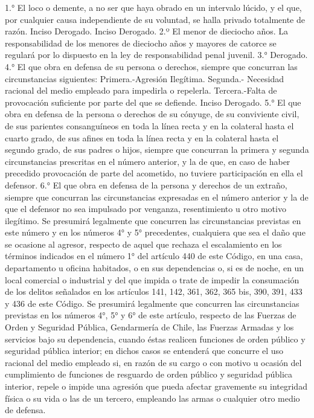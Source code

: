     1.° El loco o demente, a no ser que haya obrado en un intervalo lúcido, y el que, por cualquier causa independiente de su voluntad, se halla privado totalmente de razón.
    Inciso Derogado.
    Inciso Derogado.
    2.º El menor de dieciocho años. La responsabilidad de los menores de dieciocho años y mayores de catorce se regulará por lo dispuesto en la ley de responsabilidad penal juvenil.
    3.° Derogado.
    4.° El que obra en defensa de su persona o derechos, siempre que concurran las circunstancias siguientes:
    Primera.-Agresión Ilegítima.
    Segunda.- Necesidad racional del medio empleado para impedirla o repelerla.
    Tercera.-Falta de provocación suficiente por parte del que se defiende.
    Inciso Derogado.
    5.° El que obra en defensa de la persona o derechos de su cónyuge, de su conviviente civil, de sus parientes consanguíneos en toda la línea recta y en la colateral hasta el cuarto grado, de sus afines en toda la línea recta y en la colateral hasta el segundo grado, de sus padres o hijos, siempre que concurran la primera y segunda circunstancias prescritas en el número anterior, y la de que, en caso de haber precedido provocación de parte del acometido, no tuviere participación en ella el defensor.
    6.° El que obra en defensa de la persona y derechos de un extraño, siempre que concurran las circunstancias expresadas en el número anterior y la de que el defensor no sea impulsado por venganza, resentimiento u otro motivo ilegítimo.
    Se presumirá legalmente que concurren las circunstancias previstas en este número y en los números 4° y 5° precedentes, cualquiera que sea el daño que se ocasione al agresor, respecto de aquel que rechaza el escalamiento en los términos indicados en el número 1° del artículo 440 de este Código, en una casa, departamento u oficina habitados, o en sus dependencias o, si es de noche, en un local comercial o industrial y del que impida o trate de impedir la consumación de los delitos señalados en los artículos 141, 142, 361, 362, 365 bis, 390, 391, 433 y 436 de este Código.
    Se presumirá legalmente que concurren las circunstancias previstas en los números 4°, 5° y 6° de este artículo, respecto de las Fuerzas de Orden y Seguridad Pública, Gendarmería de Chile, las Fuerzas Armadas y los servicios bajo su dependencia, cuando éstas realicen funciones de orden público y seguridad pública interior; en dichos casos se entenderá que concurre el uso racional del medio empleado si, en razón de su cargo o con motivo u ocasión del cumplimiento de funciones de resguardo de orden público y seguridad pública interior, repele o impide una agresión que pueda afectar gravemente su integridad física o su vida o las de un tercero, empleando las armas o cualquier otro medio de defensa.

